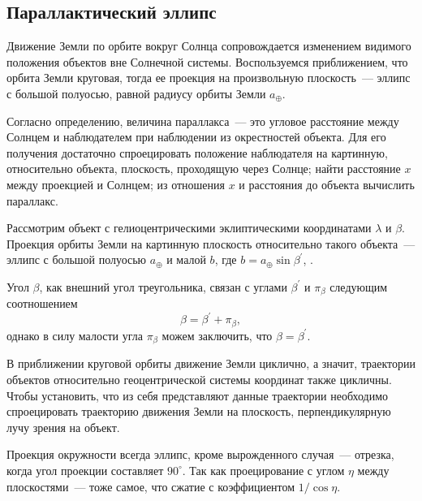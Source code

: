 \subsection{Параллактический эллипс}
Движение Земли по орбите вокруг Солнца сопровождается изменением видимого положения объектов вне Солнечной системы. Воспользуемся приближением, что орбита Земли круговая, тогда ее проекция на произвольную плоскость~--- эллипс с большой полуосью, равной радиусу орбиты Земли $a_\oplus$. 

Согласно определению, величина параллакса~--- это угловое расстояние между Солнцем и наблюдателем при наблюдении из окрестностей объекта. Для его получения достаточно спроецировать положение наблюдателя на картинную, относительно объекта, плоскость, проходящую через Солнце; найти расстояние $x$ между проекцией и Солнцем; из отношения $x$ и расстояния до объекта вычислить параллакс.

Рассмотрим объект с гелиоцентрическими эклиптическими координатами $\lambda$ и $\beta$. Проекция орбиты Земли на картинную плоскость относительно такого объекта~--- эллипс с большой полуосью $a_\oplus$ и малой $b$, где $b = a_\oplus \sin \beta^\prime$, . %

Угол $\beta$, как внешний угол треугольника, связан с углами $\beta^\prime$ и $\pi_{\beta}$ следующим соотношением
\begin{equation*}
	\beta = \beta^\prime + \pi_{\beta},
\end{equation*} 
однако в силу малости угла $\pi_{\beta}$ можем заключить, что $\beta = \beta^\prime$.

В приближении круговой орбиты движение Земли циклично, а значит, траектории объектов относительно геоцентрической системы координат также цикличны. Чтобы установить, что из себя представляют данные траектории необходимо спроецировать траекторию движения Земли на плоскость, перпендикулярную лучу зрения на объект.

Проекция окружности всегда эллипс, кроме вырожденного случая~--- отрезка, когда угол проекции составляет $90^\circ$. Так как проецирование с углом $\eta$ между плоскостями~--- тоже самое, что сжатие с коэффициентом $1/\cos\eta$.

